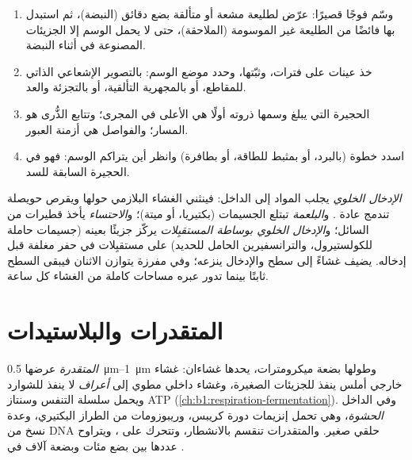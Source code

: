 \begin{method}\label{met:b1:eukaryotic-cell:pulsechase}
\begin{enumerate}
  \item وسّم فوجًا قصيرًا: عرّض  لطليعة مشعة أو متألقة بضع
        دقائق (النبضة)، ثم استبدل بها فائضًا من الطليعة غير الموسومة
        (الملاحقة)، حتى لا يحمل الوسم إلا الجزيئات المصنوعة في أثناء
        النبضة.
  \item خذ عينات على فترات، وثبّتها، وحدد موضع الوسم: بالتصوير
        الإشعاعي الذاتي للمقاطع، أو بالمجهرية التألقية، أو بالتجزئة
        والعد.
  \item الحجيرة التي يبلغ وسمها ذروته أولًا هي الأعلى في المجرى؛
        وتتابع الذُّرى هو المسار؛ والفواصل هي أزمنة العبور.
  \item اسدد خطوة (بالبرد، أو بمثبط للطاقة، أو بطافرة) وانظر أين
        يتراكم الوسم: فهو في الحجيرة السابقة للسد.
\end{enumerate}
\end{method}

\begin{definition}\label{def:b1:eukaryotic-cell:endocytosis}
\emph{الإدخال الخلوي} يجلب المواد إلى الداخل:
فينثني الغشاء البلازمي حولها ويقرص حويصلة تندمج عادة .
و\emph{البلعمة} تبتلع الجسيمات (بكتيريا، أو  ميتة)؛
و\emph{الاحتساء} يأخذ قطيرات من السائل؛ و\emph{الإدخال الخلوي
بوساطة المستقبِلات} يركّز جزيئًا بعينه (جسيمات حاملة للكولستيرول،
والترانسفيرين الحامل للحديد) على مستقبِلات في حفر مغلفة قبل إدخاله.
 يضيف غشاءً إلى سطح  والإدخال ينزعه؛ وفي 
مفرزة يتوازن الاثنان فيبقى السطح ثابتًا بينما تدور عبره مساحات
كاملة من الغشاء كل ساعة.
\end{definition}

\section{المتقدرات والبلاستيدات}

\begin{definition}[المتقدرة]\label{def:b1:eukaryotic-cell:mitochondrion}
\emph{المتقدرة}  عرضها
\qtyrange{0.5}{1}{\micro m} وطولها بضعة ميكرومترات، يحدها غشاءان:
غشاء خارجي أملس ينفذ للجزيئات الصغيرة، وغشاء داخلي مطوي إلى
\emph{أعراف} لا ينفذ للشوارد ويحمل سلسلة التنفس وسنتاز
ATP (\cref{ch:b1:respiration-fermentation}). وفي الداخل
\emph{الحشوة}، وهي تحمل إنزيمات دورة كريبس،
وريبوزومات من الطراز البكتيري، وعدة نسخ من DNA حلقي صغير. والمتقدرات
تنقسم بالانشطار، وتتحرك على ، ويتراوح عددها بين بضع مئات
وبضعة آلاف في .
\end{definition}

